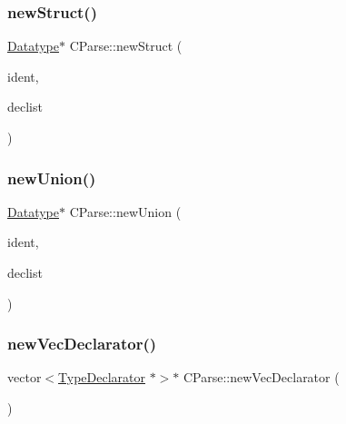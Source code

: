 \subsubsection{\texorpdfstring{newStruct()}{newStruct()}}
{\footnotesize\ttfamily \mbox{\hyperlink{class_datatype}{Datatype}}$\ast$ C\+Parse\+::new\+Struct (\begin{DoxyParamCaption}\item[{const string \&}]{ident,  }\item[{vector$<$ \mbox{\hyperlink{class_type_declarator}{Type\+Declarator}} $\ast$ $>$ $\ast$}]{declist }\end{DoxyParamCaption})}

\mbox{\label{class_c_parse_a617280e1818c23016f6d440aa9c9d9db}} 
\subsubsection{\texorpdfstring{newUnion()}{newUnion()}}
{\footnotesize\ttfamily \mbox{\hyperlink{class_datatype}{Datatype}}$\ast$ C\+Parse\+::new\+Union (\begin{DoxyParamCaption}\item[{const string \&}]{ident,  }\item[{vector$<$ \mbox{\hyperlink{class_type_declarator}{Type\+Declarator}} $\ast$ $>$ $\ast$}]{declist }\end{DoxyParamCaption})}

\mbox{\label{class_c_parse_af6cf05cad0d6b3edfc9faf953f33608f}} 
\subsubsection{\texorpdfstring{newVecDeclarator()}{newVecDeclarator()}}
{\footnotesize\ttfamily vector$<$\mbox{\hyperlink{class_type_declarator}{Type\+Declarator}} $\ast$$>$$\ast$ C\+Parse\+::new\+Vec\+Declarator (\begin{DoxyParamCaption}\item[{void}]{ }\end{DoxyParamCaption})}

\mbox{\label{class_c_parse_ad7c7c258d545f0caaf27cc8c0ac56807}} 
